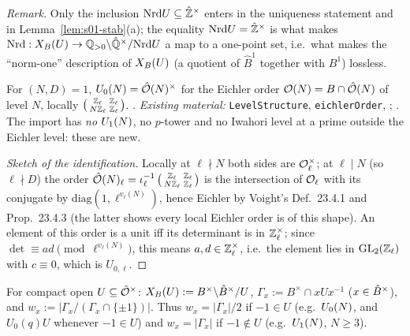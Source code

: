\noindent\emph{Remark.} Only the inclusion $\mathrm{Nrd} U\subseteq\hat{\mathbb{Z}}^\times$ enters in the uniqueness statement and in Lemma~\ref{lem:s01-stab}(a); the
equality $\mathrm{Nrd} U=\hat{\mathbb{Z}}^\times$ is what makes $\mathrm{Nrd}:X_B(U)\to\mathbb{Q}_{>0}\backslash\hat{\mathbb{Q}}^\times/\mathrm{Nrd} U$ a map to a one-point set, i.e.\ what
makes the ``norm-one'' description of $X_B(U)$ (a quotient of $\hat B^1$ together with $B^1$) lossless.


\begin{proposition}\label{prop:s01-eichler}
For $(N,D)=1$, $U_0(N)=\hat{\mathcal{O}}(N)^\times$ for the Eichler order $\mathcal{O}(N)=B\cap\hat{\mathcal{O}}(N)$ of level $N$, locally
$\left(\begin{smallmatrix}\mathbb{Z}_\ell&\mathbb{Z}_\ell\\N\mathbb{Z}_\ell&\mathbb{Z}_\ell\end{smallmatrix}\right)$. \stknown{}
.
\emph{Existing material:}  \texttt{LevelStructure}, \texttt{eichlerOrder},
;  .
The import has \emph{no} $U_1(N)$, no $p$-tower and no Iwahori level at a prime outside the Eichler level: these are new.
\end{proposition}
\begin{proof}[Sketch of the identification]
Locally at $\ell\nmid N$ both sides are $\mathcal{O}_\ell^\times$; at $\ell\mid N$ (so $\ell\nmid D$) the order $\hat{\mathcal{O}}(N)_\ell=\iota_\ell^{-1}
\left(\begin{smallmatrix}\mathbb{Z}_\ell&\mathbb{Z}_\ell\\N\mathbb{Z}_\ell&\mathbb{Z}_\ell\end{smallmatrix}\right)$ is the intersection of $\mathcal{O}_\ell$ with its conjugate
by $\mathrm{diag}(1,\ell^{v_\ell(N)})$, hence Eichler by Voight's Def.~23.4.1 and Prop.~23.4.3 (the latter shows every local Eichler order
is of this shape). An element of this order is a unit iff its determinant is in $\mathbb{Z}_\ell^\times$; since $\det\equiv ad\pmod{\ell^{v_\ell(N)}}$,
this means $a,d\in\mathbb{Z}_\ell^\times$, i.e.\ the element lies in $\mathrm{GL}_2(\mathbb{Z}_\ell)$ with $c\equiv0$, which is $U_{0,\ell}$.
\end{proof}

\begin{definition}\label{def:s01-classset}
For compact open $U\subseteq\hat{\mathcal{O}}^\times$: $X_B(U):=B^\times\backslash\hat{B}^\times/U$,
$\Gamma_x:=B^\times\cap xUx^{-1}$ ($x\in\hat{B}^\times$), and $w_x:=|\Gamma_x/(\Gamma_x\cap\{\pm1\})|$.
Thus $w_x=|\Gamma_x|/2$ if $-1\in U$ (e.g.\ $U_0(N)$, and $U_0(q)U$ whenever $-1\in U$) and $w_x=|\Gamma_x|$ if $-1\notin U$
(e.g.\ $U_1(N)$, $N\ge3$).
\end{definition}


